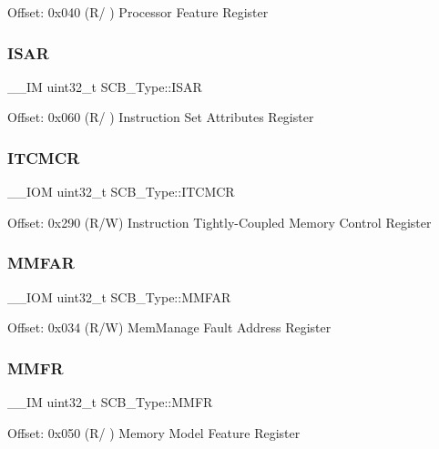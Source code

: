 Offset\+: 0x040 (R/ ) Processor Feature Register \mbox{\label{struct_s_c_b___type_a00e93446b3433a807f1574fa2f1fce54}} 
\subsubsection{\texorpdfstring{ISAR}{ISAR}}
{\footnotesize\ttfamily \+\_\+\+\_\+\+IM uint32\+\_\+t S\+C\+B\+\_\+\+Type\+::\+I\+S\+AR}

Offset\+: 0x060 (R/ ) Instruction Set Attributes Register \mbox{\label{struct_s_c_b___type_aba8abbd3db06a07b50f56547501983f9}} 
\subsubsection{\texorpdfstring{ITCMCR}{ITCMCR}}
{\footnotesize\ttfamily \+\_\+\+\_\+\+I\+OM uint32\+\_\+t S\+C\+B\+\_\+\+Type\+::\+I\+T\+C\+M\+CR}

Offset\+: 0x290 (R/W) Instruction Tightly-\/\+Coupled Memory Control Register \mbox{\label{struct_s_c_b___type_a2d03d0b7cec2254f39eb1c46c7445e80}} 
\subsubsection{\texorpdfstring{MMFAR}{MMFAR}}
{\footnotesize\ttfamily \+\_\+\+\_\+\+I\+OM uint32\+\_\+t S\+C\+B\+\_\+\+Type\+::\+M\+M\+F\+AR}

Offset\+: 0x034 (R/W) Mem\+Manage Fault Address Register \mbox{\label{struct_s_c_b___type_a4f353f207bb27a1cea7861aa9eb00dbb}} 
\subsubsection{\texorpdfstring{MMFR}{MMFR}}
{\footnotesize\ttfamily \+\_\+\+\_\+\+IM uint32\+\_\+t S\+C\+B\+\_\+\+Type\+::\+M\+M\+FR}

Offset\+: 0x050 (R/ ) Memory Model Feature Register \mbox{\label{struct_s_c_b___type_a7a1ba0f875c0e97c1673882b1106e66b}} 
